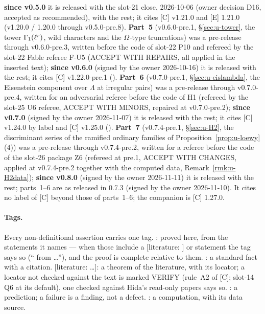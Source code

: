 \documentclass[11pt]{article}
\newcommand{\LIT}[1]{\textsf{[literature: #1]}}   %
\newcommand{\VERIFYloc}{\textsf{VERIFY}}          %
\newcommand{\Iw}{\Lambda}                         %
\newcommand{\Om}[1]{\Omega_{#1}}                      %
\begin{document}
\textbf{since v0.5.0} it is released with the slot-21 close, 2026-10-06 (owner decision D16, accepted as recommended), with the rest; it cites [C] v1.21.0 and [E] 1.21.0 (v1.20.0 / 1.20.0 through v0.5.0-pre.8). \textbf{Part~5} (v0.6.0-pre.1, \S\ref{sec:u-tower}, the tower $\Gamma_1(\ell^{r})$, wild characters
and the $\Om{}$-type truncations) was a pre-release through v0.6.0-pre.3, written before the code of slot-22 P10 and refereed by the slot-22 Fable referee F-U5 (ACCEPT WITH REPAIRS,
all applied in the inserted text); \textbf{since v0.6.0} (signed by the owner 2026-10-16) it is released with the rest; it cites [C] v1.22.0-pre.1 (). \textbf{Part~6} (v0.7.0-pre.1, \S\ref{sec:u-eislambda}, the Eisenstein component over $\Iw$ at irregular pairs) was a pre-release through v0.7.0-pre.4,
written for an adversarial referee before the code of H1 (refereed by the slot-25 U6 referee, ACCEPT WITH MINORS, repaired at v0.7.0-pre.2); \textbf{since v0.7.0} (signed by the owner 2026-11-07)
it is released with the rest; it cites [C] v1.24.0 by label and [C] v1.25.0 ().
\textbf{Part~7} (v0.7.4-pre.1, \S\ref{sec:u-H2}, the discriminant series of the ramified ordinary families of Proposition~\ref{prop:u-loewy}(4)) was a pre-release through v0.7.4-pre.2,
written for a referee before the code of the slot-26 package Z6 (refereed at pre.1, ACCEPT WITH CHANGES, applied at v0.7.4-pre.2 together with the computed data, Remark~\ref{rmk:u-H2data});
\textbf{since v0.8.0} (signed by the owner 2026-11-11) it is released with the rest; parts~1--6 are as released in 0.7.3 (signed by the owner 2026-11-10). It cites no label of [C] beyond those of parts~1--6;
the companion is [C] 1.27.0.

\paragraph{Tags.} Every non-definitional assertion carries one tag. \PROVED: proved here, from the statements it
names --- when those include a \LIT{} or \STD{} statement the tag says so (``\PROVED{} from \dots''), and the proof is
complete relative to them. \STD{\dots}: a standard fact with a citation. \LIT{\dots}: a theorem of the literature,
with its locator; a locator not checked against the text is marked \VERIFYloc{} (rule~A2 of [C]; slot-14 Q6 at its
default), one checked against Hida's read-only papers says so. \CONJ: a prediction; a failure is a finding, not a
defect. \COMP: a computation, with its data source.
\end{document}
